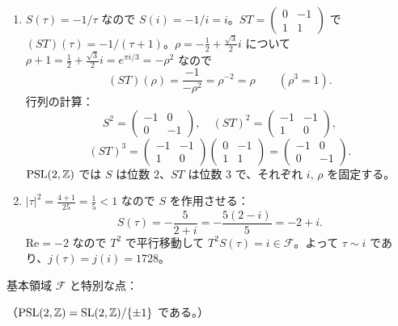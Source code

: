 \begin{enumerate}
  \item $S(\tau)=-1/\tau$ なので $S(i)=-1/i=i$。$ST=\begin{pmatrix}0&-1\\1&1\end{pmatrix}$ で $(ST)(\tau)=-1/(\tau+1)$。$\rho=-\tfrac12+\tfrac{\sqrt3}2i$ について $\rho+1=\tfrac12+\tfrac{\sqrt3}{2}i=e^{\pi i/3}=-\rho^2$ なので
  \[
    (ST)(\rho)=\frac{-1}{-\rho^2}=\rho^{-2}=\rho\qquad(\rho^3=1).
  \]
  行列の計算：
  \[
    S^2=\begin{pmatrix}-1&0\\0&-1\end{pmatrix},\quad
    (ST)^2=\begin{pmatrix}-1&-1\\1&0\end{pmatrix},
  \]
  \[
    (ST)^3=\begin{pmatrix}-1&-1\\1&0\end{pmatrix}\begin{pmatrix}0&-1\\1&1\end{pmatrix}=\begin{pmatrix}-1&0\\0&-1\end{pmatrix}.
  \]
  $\mathrm{PSL}(2,\mathbb{Z})$ では $S$ は位数 $2$、$ST$ は位数 $3$ で、それぞれ $i$, $\rho$ を固定する。
  \item $|\tau|^2=\tfrac{4+1}{25}=\tfrac15<1$ なので $S$ を作用させる：
  \[
    S(\tau)=-\frac{5}{2+i}=-\frac{5(2-i)}{5}=-2+i.
  \]
  $\mathrm{Re}=-2$ なので $T^2$ で平行移動して $T^2S(\tau)=i\in\mathcal F$。よって $\tau\sim i$ であり、$j(\tau)=j(i)=1728$。
\end{enumerate}
基本領域 $\mathcal F$ と特別な点：
\begin{center}
\end{center}
（$\mathrm{PSL}(2,\mathbb{Z})=\operatorname{SL}(2,\mathbb{Z})/\{\pm1\}$ である。）

